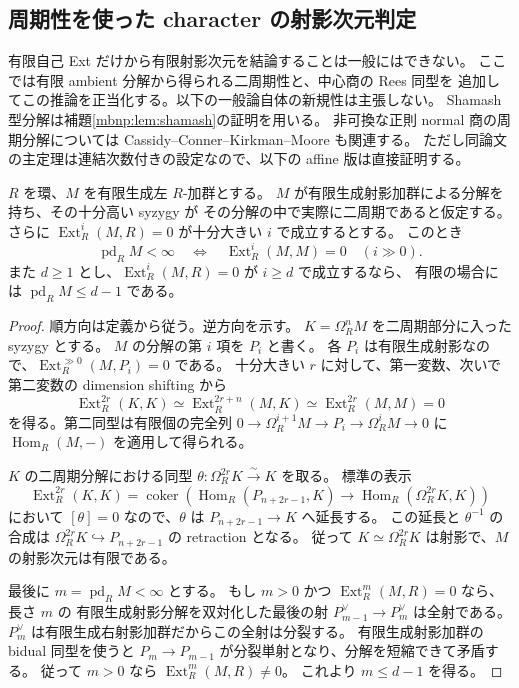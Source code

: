 \subsection{周期性を使った character の射影次元判定}

有限自己 Ext だけから有限射影次元を結論することは一般にはできない。
ここでは有限 ambient 分解から得られる二周期性と、中心商の Rees 同型を
追加してこの推論を正当化する。以下の一般論自体の新規性は主張しない。
Shamash 型分解は補題\ref{mbnp:lem:shamash}の証明を用いる。
非可換な正則 normal 商の周期分解については Cassidy--Conner--Kirkman--Moore
\cite[Theorem~4.2]{CMOPeriodicMF} も関連する。
ただし同論文の主定理は連結次数付きの設定なので、以下の affine 版は直接証明する。

\begin{lemma}[二周期性による有限射影次元の検出]
\label{cmo:lem:periodic-pd}
$R$ を環、$M$ を有限生成左 $R$-加群とする。
$M$ が有限生成射影加群による分解を持ち、その十分高い syzygy が
その分解の中で実際に二周期であると仮定する。
さらに $\operatorname{Ext}_R^i(M,R)=0$ が十分大きい $i$ で成立するとする。
このとき
\[
 \operatorname{pd}_R M<\infty
 \quad\Longleftrightarrow\quad
 \operatorname{Ext}_R^i(M,M)=0\quad(i\gg0).
\]
また $d\ge1$ とし、$\operatorname{Ext}_R^i(M,R)=0$ が $i\ge d$ で成立するなら、
有限の場合には $\operatorname{pd}_R M\le d-1$ である。
\end{lemma}
\begin{proof}
順方向は定義から従う。逆方向を示す。
$K=\Omega_R^n M$ を二周期部分に入った syzygy とする。
$M$ の分解の第 $i$ 項を $P_i$ と書く。
各 $P_i$ は有限生成射影なので、$\operatorname{Ext}_R^{\gg0}(M,P_i)=0$ である。
十分大きい $r$ に対して、第一変数、次いで第二変数の dimension shifting から
\[
 \operatorname{Ext}_R^{2r}(K,K)
 \simeq\operatorname{Ext}_R^{2r+n}(M,K)
 \simeq\operatorname{Ext}_R^{2r}(M,M)=0
\]
を得る。第二同型は有限個の完全列
$0\to\Omega_R^{i+1}M\to P_i\to\Omega_R^iM\to0$
に $\operatorname{Hom}_R(M,-)$ を適用して得られる。

$K$ の二周期分解における同型
$\theta:\Omega_R^{2r}K\xrightarrow{\sim}K$ を取る。
標準の表示
\[
 \operatorname{Ext}_R^{2r}(K,K)
 =\operatorname{coker}\!\left(
  \operatorname{Hom}_R(P_{n+2r-1},K)
  \longrightarrow\operatorname{Hom}_R(\Omega_R^{2r}K,K)\right)
\]
において $[\theta]=0$ なので、$\theta$ は $P_{n+2r-1}\to K$ へ延長する。
この延長と $\theta^{-1}$ の合成は
$\Omega_R^{2r}K\hookrightarrow P_{n+2r-1}$ の retraction となる。
従って $K\simeq\Omega_R^{2r}K$ は射影で、$M$ の射影次元は有限である。

最後に $m=\operatorname{pd}_R M<\infty$ とする。
もし $m>0$ かつ $\operatorname{Ext}_R^m(M,R)=0$ なら、長さ $m$ の
有限生成射影分解を双対化した最後の射
$P_{m-1}^{\vee}\to P_m^{\vee}$ は全射である。
$P_m^{\vee}$ は有限生成右射影加群だからこの全射は分裂する。
有限生成射影加群の bidual 同型を使うと
$P_m\to P_{m-1}$ が分裂単射となり、分解を短縮できて矛盾する。
従って $m>0$ なら $\operatorname{Ext}_R^m(M,R)\ne0$。
これより $m\le d-1$ を得る。
\end{proof}

